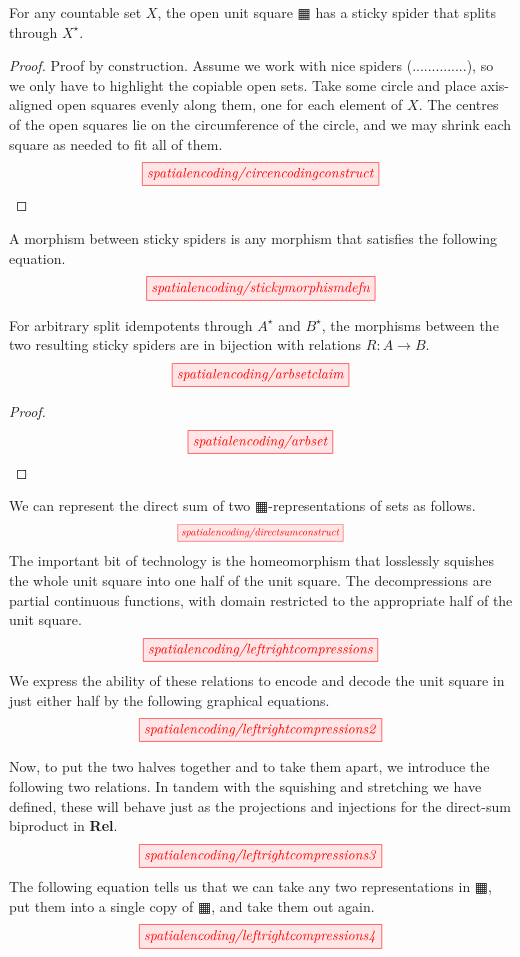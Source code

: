 \begin{lemma}
For any countable set $X$, the open unit square $\squarehvfill$ has a sticky spider that splits through $X^\star$.
\begin{proof}
Proof by construction. Assume we work with nice spiders (..............), so we only have to highlight the copiable open sets. Take some circle and place axis-aligned open squares evenly along them, one for each element of $X$. The centres of the open squares lie on the circumference of the circle, and we may shrink each square as needed to fit all of them.
\[\scalebox{1}{\tikzfig{spatialencoding/circencodingconstruct}}\]
\end{proof}
\end{lemma}

\begin{defn}
A morphism between sticky spiders is any morphism that satisfies the following equation.
\[\scalebox{1}{\tikzfig{spatialencoding/stickymorphismdefn}}\]
\end{defn}

\begin{lemma}
For arbitrary split idempotents through $A^\star$ and $B^\star$, the morphisms between the two resulting sticky spiders are in bijection with relations $R: A \rightarrow B$.
\[\scalebox{1}{\tikzfig{spatialencoding/arbsetclaim}}\]
\begin{proof}
\[\scalebox{1}{\tikzfig{spatialencoding/arbset}}\]
\end{proof}
\end{lemma}

\begin{construction}
We can represent the direct sum of two $\squarehvfill$-representations of sets as follows.
\[\scalebox{0.75}{\tikzfig{spatialencoding/directsumconstruct}}\]
The important bit of technology is the homeomorphism that losslessly squishes the whole unit square into one half of the unit square. The decompressions are partial continuous functions, with domain restricted to the appropriate half of the unit square.
\[\scalebox{1}{\tikzfig{spatialencoding/leftrightcompressions}}\]
We express the ability of these relations to encode and decode the unit square in just either half by the following graphical equations.
\[\scalebox{1}{\tikzfig{spatialencoding/leftrightcompressions2}}\]
\end{construction}
Now, to put the two halves together and to take them apart, we introduce the following two relations. In tandem with the squishing and stretching we have defined, these will behave just as the projections and injections for the direct-sum biproduct in \textbf{Rel}.
\[\scalebox{1}{\tikzfig{spatialencoding/leftrightcompressions3}}\]
The following equation tells us that we can take any two representations in $\squarehvfill$, put them into a single copy of $\squarehvfill$, and take them out again.
\[\scalebox{1}{\tikzfig{spatialencoding/leftrightcompressions4}}\]

